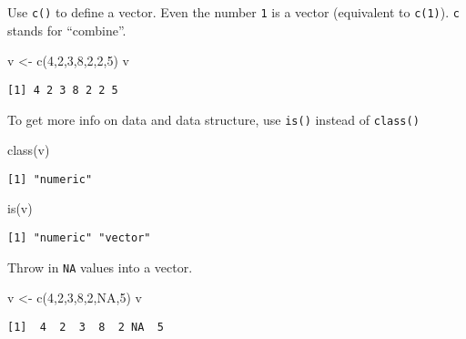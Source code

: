 \documentclass[
  letterpaper,
  DIV=11,
  numbers=noendperiod]{scrartcl}
\newenvironment{Shaded}{\begin{snugshade}}{\end{snugshade}}
\newcommand{\ConstantTok}[1]{\textcolor[rgb]{0.56,0.35,0.01}{#1}}
\newcommand{\DecValTok}[1]{\textcolor[rgb]{0.68,0.00,0.00}{#1}}
\newcommand{\FunctionTok}[1]{\textcolor[rgb]{0.28,0.35,0.67}{#1}}
\newcommand{\NormalTok}[1]{\textcolor[rgb]{0.00,0.23,0.31}{#1}}
\newcommand{\OtherTok}[1]{\textcolor[rgb]{0.00,0.23,0.31}{#1}}
\begin{document}
Use \texttt{c()} to define a vector. Even the number \texttt{1} is a
vector (equivalent to \texttt{c(1)}). \texttt{c} stands for ``combine''.

\begin{Shaded}
\begin{Highlighting}[]
\NormalTok{v }\OtherTok{\textless{}{-}} \FunctionTok{c}\NormalTok{(}\DecValTok{4}\NormalTok{,}\DecValTok{2}\NormalTok{,}\DecValTok{3}\NormalTok{,}\DecValTok{8}\NormalTok{,}\DecValTok{2}\NormalTok{,}\DecValTok{2}\NormalTok{,}\DecValTok{5}\NormalTok{)}
\NormalTok{v}
\end{Highlighting}
\end{Shaded}

\begin{verbatim}
[1] 4 2 3 8 2 2 5
\end{verbatim}

To get more info on data and data structure, use \texttt{is()} instead
of \texttt{class()}

\begin{Shaded}
\begin{Highlighting}[]
\FunctionTok{class}\NormalTok{(v)}
\end{Highlighting}
\end{Shaded}

\begin{verbatim}
[1] "numeric"
\end{verbatim}

\begin{Shaded}
\begin{Highlighting}[]
\FunctionTok{is}\NormalTok{(v)}
\end{Highlighting}
\end{Shaded}

\begin{verbatim}
[1] "numeric" "vector" 
\end{verbatim}

Throw in \texttt{NA} values into a vector.

\begin{Shaded}
\begin{Highlighting}[]
\NormalTok{v }\OtherTok{\textless{}{-}} \FunctionTok{c}\NormalTok{(}\DecValTok{4}\NormalTok{,}\DecValTok{2}\NormalTok{,}\DecValTok{3}\NormalTok{,}\DecValTok{8}\NormalTok{,}\DecValTok{2}\NormalTok{,}\ConstantTok{NA}\NormalTok{,}\DecValTok{5}\NormalTok{)}
\NormalTok{v}
\end{Highlighting}
\end{Shaded}

\begin{verbatim}
[1]  4  2  3  8  2 NA  5
\end{verbatim}
\end{document}
